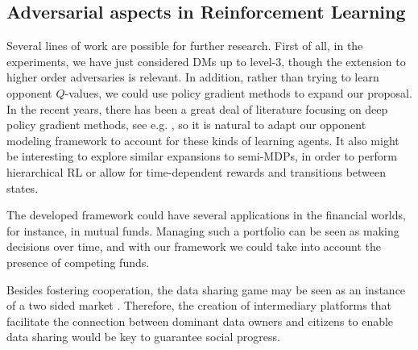 \subsection{Adversarial aspects in Reinforcement Learning}

Several lines of work are possible for further research. First of all, in the experiments, we have just considered DMs up to level-3,
though the extension to higher order adversaries is relevant. %
In addition, rather than trying to learn opponent $Q$-values, we could
use policy gradient methods \parencite{baxter2000direct} to expand our proposal. In the recent years, there has been a great deal of literature focusing on deep policy gradient methods, see e.g.  \cite{pmlr-v48-mniha16,schulman2017ppo}, so it is natural to adapt our opponent modeling framework to account for these kinds of learning agents.
It also might be interesting to explore similar expansions to semi-MDPs, 
in order to perform hierarchical RL or allow for time-dependent rewards 
and transitions between states.

The developed framework could have several applications in the financial worlds, for instance, in mutual funds. Managing such a portfolio can be seen as making decisions over time, and with our framework we could take into account the presence of competing funds.

 Besides fostering cooperation,  the data sharing game may be seen as
  an instance of a two sided market \parencite{rochet2006two}. Therefore,
  the creation of intermediary platforms that facilitate the connection between dominant data owners and citizens to enable data sharing
  would be key to guarantee social progress. 